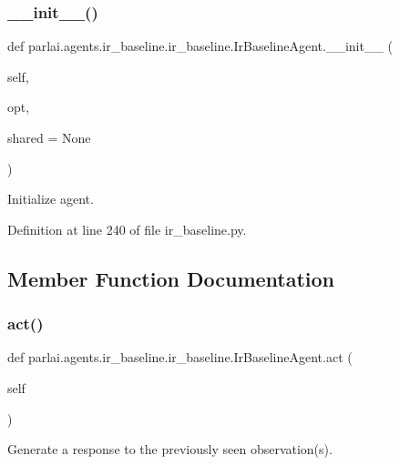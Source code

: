 \subsubsection{\texorpdfstring{\+\_\+\+\_\+init\+\_\+\+\_\+()}{\_\_init\_\_()}}
{\footnotesize\ttfamily def parlai.\+agents.\+ir\+\_\+baseline.\+ir\+\_\+baseline.\+Ir\+Baseline\+Agent.\+\_\+\+\_\+init\+\_\+\+\_\+ (\begin{DoxyParamCaption}\item[{}]{self,  }\item[{}]{opt,  }\item[{}]{shared = {\ttfamily None} }\end{DoxyParamCaption})}

\begin{DoxyVerb}Initialize agent.\end{DoxyVerb}
 

Definition at line 240 of file ir\+\_\+baseline.\+py.



\subsection{Member Function Documentation}
\mbox{\label{classparlai_1_1agents_1_1ir__baseline_1_1ir__baseline_1_1IrBaselineAgent_af4e39c5613a045434a38d260e6fc03e6}} 
\subsubsection{\texorpdfstring{act()}{act()}}
{\footnotesize\ttfamily def parlai.\+agents.\+ir\+\_\+baseline.\+ir\+\_\+baseline.\+Ir\+Baseline\+Agent.\+act (\begin{DoxyParamCaption}\item[{}]{self }\end{DoxyParamCaption})}

\begin{DoxyVerb}Generate a response to the previously seen observation(s).\end{DoxyVerb}
 

